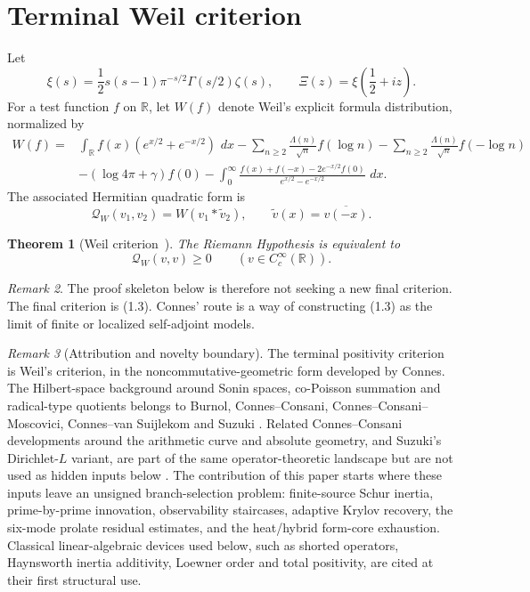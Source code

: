 \documentclass[11pt]{amsart}
\newtheorem{theorem}{Theorem}[section]
\theoremstyle{definition}
\theoremstyle{remark}
\newtheorem{remark}[theorem]{Remark}
\newcommand{\R}{\mathbb R}
\newcommand{\dd}{\,d}
\newcommand{\QW}{\mathcal Q_W}
\newcommand{\XiR}{\Xi}
\begin{document}
\maketitle
\tableofcontents

\section{Terminal Weil criterion}

Let
\[
 \xi(s)=\frac12s(s-1)\pi^{-s/2}\Gamma(s/2)\zeta(s),
 \qquad
 \XiR(z)=\xi\!\left(\frac12+iz\right).
\]
For a test function \(f\) on \(\R\), let \(W(f)\) denote Weil's explicit
formula distribution, normalized by
\[
\begin{aligned}
 W(f)=&
 \int_\R f(x)(e^{x/2}+e^{-x/2})\,\dd x
 -\sum_{n\ge2}\frac{\Lambda(n)}{\sqrt n}f(\log n)
 -\sum_{n\ge2}\frac{\Lambda(n)}{\sqrt n}f(-\log n)\\
&-(\log 4\pi+\gamma)f(0)
 -\int_0^\infty
 \frac{f(x)+f(-x)-2e^{-x/2}f(0)}{e^{x/2}-e^{-x/2}}\,\dd x .
\end{aligned}
\tag{1.1}
\]
The associated Hermitian quadratic form is
\[
 \QW(v_1,v_2)=W(v_1*\widetilde v_2),
 \qquad \widetilde v(x)=\overline{v(-x)}.
\tag{1.2}
\]

\begin{theorem}[Weil criterion~\cite{Weil1952,Connes1999}]
\label{thm:weil}
The Riemann Hypothesis is equivalent to
\[
 \QW(v,v)\ge0
 \qquad(v\in C_c^\infty(\R)).
\tag{1.3}
\]
\end{theorem}

\begin{remark}
The proof skeleton below is therefore not seeking a new final criterion.
The final criterion is (1.3).  Connes' route is a way of constructing
(1.3) as the limit of finite or localized self-adjoint models.
\end{remark}

\begin{remark}[Attribution and novelty boundary]
The terminal positivity criterion is Weil's criterion, in the
noncommutative-geometric form developed by Connes.  The Hilbert-space
background around Sonin spaces, co-Poisson summation and radical-type
quotients belongs to Burnol, Connes--Consani,
Connes--Consani--Moscovici, Connes--van Suijlekom and Suzuki
\cite{Burnol2004,Burnol2007,CCArch,CCM2025,CvS2025,Suzuki2025,SuzukiScrew}.
Related Connes--Consani developments around the arithmetic curve and
absolute geometry, and Suzuki's Dirichlet-\(L\) variant, are part of the
same operator-theoretic landscape but are not used as hidden inputs below
\cite{CCJacobian,CCAbsolute,SuzukiDirichlet}.
The contribution of this paper starts where these inputs leave an unsigned branch-selection
problem: finite-source Schur inertia, prime-by-prime innovation,
observability staircases, adaptive Krylov recovery, the six-mode prolate
residual estimates, and the heat/hybrid form-core exhaustion.  Classical
linear-algebraic devices used below, such as shorted operators,
Haynsworth inertia additivity, Loewner order and total positivity, are
cited at their first structural use.
\end{remark}
\end{document}
